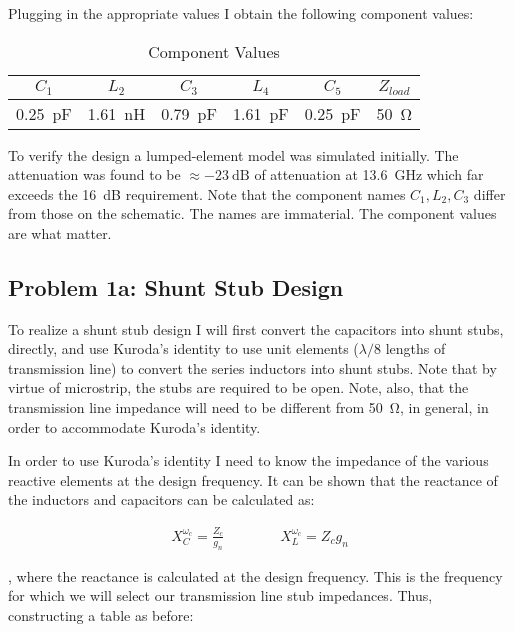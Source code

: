     Plugging in the appropriate values I obtain the following component values:

    \begin{table}[h]
        \centering
        \caption{Component Values}
        \label{tab:1a_comp_values}
        \begin{tabular}{|c|c|c|c|c|c|}
            \hline $C_1$ & $L_2$  & $C_3$ & $L_4$ & $C_5$ & $
            Z_{load}$ \\ 
            \hline \SI{.25}{\pico\farad}  & \SI{1.61}{\nano\henry} &
            \SI{.79}{\pico\farad}  & \SI{1.61}{\pico\farad}  &
            \SI{.25}{\pico\farad} &
            \SI{50}{\ohm}  \\
            \hline
        \end{tabular}
    \end{table}

    To verify the design a lumped-element model was simulated initially. The
    attenuation was found to be $\approx \SI{-23}{\deci\bel}$ of attenuation at
    \SI{13.6}{\giga\hertz} which far exceeds the \SI{16}{\deci\bel} requirement.
    Note that the component names $C_1, L_2, C_3$ differ from those on the
    schematic. The names are immaterial. The component values are what matter.

    \subsection*{Problem 1a: Shunt Stub Design}
    To realize a shunt stub design I will first convert the capacitors into
    shunt stubs, directly, and use Kuroda's identity to use unit
    elements ($\lambda/8$ lengths of transmission line) to convert the
    series inductors into shunt stubs. Note that by virtue of microstrip,
    the stubs are required to be open. Note, also, that the transmission
    line impedance will need to be different from \SI{50}{\ohm}, in general,
    in order to accommodate Kuroda's identity.

    In order to use Kuroda's identity I need to know the impedance of the
    various reactive elements at the design frequency. It can be shown that
    the reactance of the inductors and capacitors can be calculated as:

    \begin{align*}
        X_C^{\omega_c} = \frac{Z_c}{g_n} \quad\quad\quad\quad X_L^{\omega_c} = Z_c g_n	
    \end{align*}

    , where the reactance is calculated at the design frequency. This is the
    frequency for which we will select our transmission line stub
    impedances. Thus, constructing a table as before:

